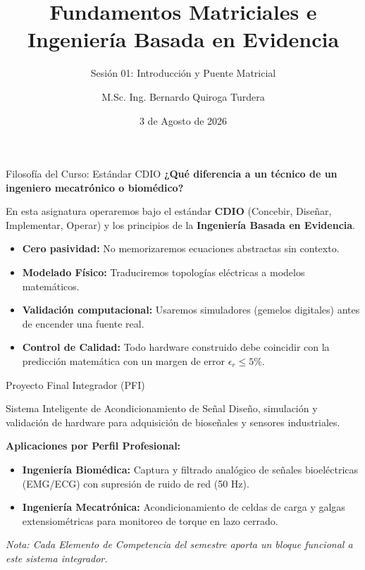 \documentclass[aspectratio=169]{beamer}
\title[Circuitos Electrónicos I]{Fundamentos Matriciales e Ingeniería Basada en Evidencia}
\subtitle{Sesión 01: Introducción y Puente Matricial}
\author[M.Sc. Ing. Bernardo Quiroga T.]{M.Sc. Ing. Bernardo Quiroga Turdera}
\institute[UCB Tarija]{
    Carrera de Ingeniería Mecatrónica\\
    Universidad Católica Boliviana ``San Pablo''\\
    Sede Tarija
}
\date{3 de Agosto de 2026}
\begin{document}
\begin{frame}
    \titlepage
\end{frame}

\begin{frame}{Filosofía del Curso: Estándar CDIO}
    \textbf{¿Qué diferencia a un técnico de un ingeniero mecatrónico o biomédico?}
    \vspace{0.5cm}
    
    En esta asignatura operaremos bajo el estándar \textbf{CDIO} (Concebir, Diseñar, Implementar, Operar) y los principios de la \textbf{Ingeniería Basada en Evidencia}.
    
    \vspace{0.5cm}
    \begin{itemize}
        \item \textbf{Cero pasividad:} No memorizaremos ecuaciones abstractas sin contexto.
        \item \textbf{Modelado Físico:} Traduciremos topologías eléctricas a modelos matemáticos.
        \item \textbf{Validación computacional:} Usaremos simuladores (gemelos digitales) antes de encender una fuente real.
        \item \textbf{Control de Calidad:} Todo hardware construido debe coincidir con la predicción matemática con un margen de error $\epsilon_r \le 5\%$.
    \end{itemize}
\end{frame}

\begin{frame}{Proyecto Final Integrador (PFI)}
    \begin{block}{Sistema Inteligente de Acondicionamiento de Señal}
        Diseño, simulación y validación de hardware para adquisición de bioseñales y sensores industriales.
    \end{block}
    
    \vspace{0.3cm}
    \textbf{Aplicaciones por Perfil Profesional:}
    \begin{itemize}
        \item \textbf{Ingeniería Biomédica:} Captura y filtrado analógico de señales bioeléctricas (EMG/ECG) con supresión de ruido de red (50 Hz).
        \item \textbf{Ingeniería Mecatrónica:} Acondicionamiento de celdas de carga y galgas extensiométricas para monitoreo de torque en lazo cerrado.
    \end{itemize}
    
    \vspace{0.3cm}
    \emph{Nota: Cada Elemento de Competencia del semestre aporta un bloque funcional a este sistema integrador.}
\end{frame}
\end{document}

